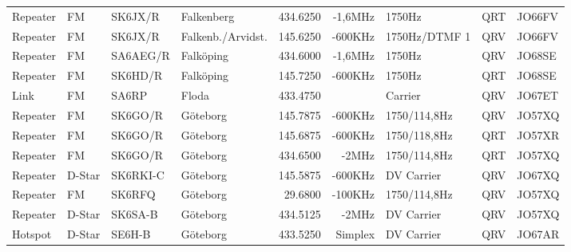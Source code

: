\begin{landscape}
\begin{longtable}{llllrrlcl}
	Repeater                  & FM            & SK6JX/R       & Falkenberg          & 434.6250          & -1,6MHz        & 1750Hz           & QRT             & JO66FV           \\
	Repeater                  & FM            & SK6JX/R       & Falkenb./Arvidst.   & 145.6250          & -600KHz        & 1750Hz/DTMF 1    & QRV             & JO66FV           \\
	Repeater                  & FM            & SA6AEG/R      & Falköping           & 434.6000          & -1,6MHz        & 1750Hz           & QRV             & JO68SE           \\
	Repeater                  & FM            & SK6HD/R       & Falköping           & 145.7250          & -600KHz        & 1750Hz           & QRT             & JO68SE           \\
	Link                      & FM            & SA6RP         & Floda               & 433.4750          &                & Carrier          & QRV             & JO67ET           \\
	Repeater                  & FM            & SK6GO/R       & Göteborg            & 145.7875          & -600KHz        & 1750/114,8Hz     & QRV             & JO57XQ           \\
	Repeater                  & FM            & SK6GO/R       & Göteborg            & 145.6875          & -600KHz        & 1750/118,8Hz     & QRT             & JO57XR           \\
	Repeater                  & FM            & SK6GO/R       & Göteborg            & 434.6500          & -2MHz          & 1750/114,8Hz     & QRT             & JO57XQ           \\
	Repeater                  & D-Star        & SK6RKI-C      & Göteborg            & 145.5875          & -600KHz        & DV Carrier       & QRV             & JO67XQ           \\
	Repeater                  & FM            & SK6RFQ        & Göteborg            & 29.6800           & -100KHz        & 1750/114,8Hz     & QRV             & JO57XQ           \\
	Repeater                  & D-Star        & SK6SA-B       & Göteborg            & 434.5125          & -2MHz          & DV Carrier       & QRV             & JO57XQ           \\
	Hotspot                   & D-Star        & SE6H-B        & Göteborg            & 433.5250          & Simplex        & DV Carrier       & QRV             & JO67AR           \\

\end{longtable}
\end{landscape}
